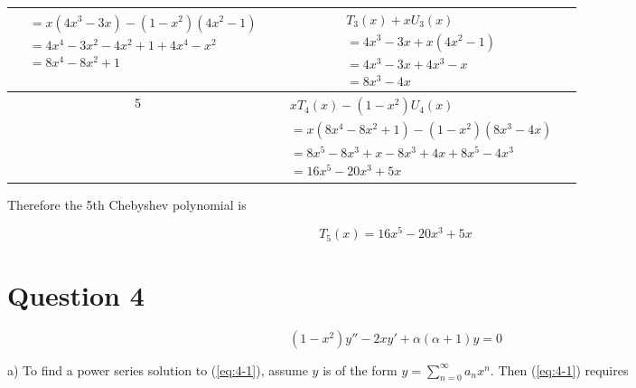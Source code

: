\documentclass{article}
\begin{document}
\begin{center}
\begin{tabular}{|c|c|c|}
{\begin{align*}
                    &= x(4x^3 - 3x) - (1 - x^2)(4x^2 - 1)\\
                    &= 4x^4 - 3x^2 - 4x^2 + 1 + 4x^4 - x^2\\
                    &= 8x^4 - 8x^2 + 1
                \end{align*}}
            & \parbox{3cm}{
                \begin{align*}
                    &T_3(x) + xU_3(x)\\
                    &= 4x^3 - 3x + x(4x^2 - 1)\\
                    &= 4x^3 - 3x + 4x^3 - x\\
                    &= 8x^3 - 4x
                \end{align*}}\\
         & \parbox{3cm}{
                \begin{align*}
                    &xT_4(x) - (1 - x^2)U_4(x)\\
                    &= x(8x^4 - 8x^2 + 1) - (1 - x^2)(8x^3 - 4x)\\
                    &= 8x^5 - 8x^3 + x - 8x^3 + 4x + 8x^5 - 4x^3\\
                    &= 16x^5 - 20x^3 + 5x
                \end{align*}}
            & \\
        \hline
    \end{tabular}
\end{center}

Therefore the 5th Chebyshev polynomial is

\begin{equation} \label{eq:3-1}
    T_5(x) = 16x^5 - 20x^3 + 5x
\end{equation}

\newpage
\section*{Question 4}

\begin{equation} \label{eq:4-1}
    (1 - x^2)y'' - 2xy' + \alpha(\alpha + 1)y = 0
\end{equation}

a) To find a power series solution to (\ref{eq:4-1}), assume $y$ is of the form $y = \sum\limits_{n = 0}^\infty a_nx^n$. Then (\ref{eq:4-1})
requires
\end{document}

